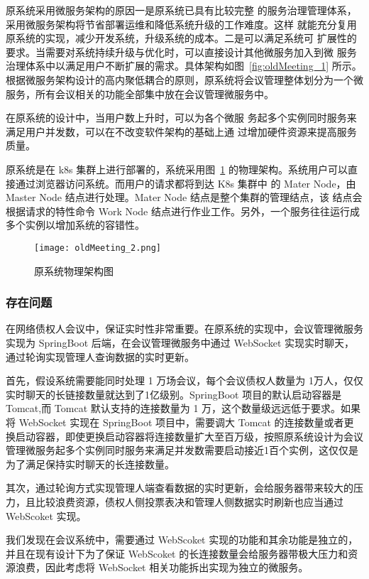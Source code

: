 原系统采用微服务架构的原因一是原系统已具有比较完整
的服务治理管理体系，采用微服务架构将节省部署运维和降低系统升级的工作难度。这样
就能充分复用原系统的实现，减少开发系统，升级系统的成本。二是可以满足系统可
扩展性的要求。当需要对系统持续升级与优化时，可以直接设计其他微服务加入到微
服务治理体系中以满足用户不断扩展的需求。具体架构如图~\ref{fig:oldMeeting_1}\cite{Wang2021} 所示。根据微服务架构设计的高内聚低耦合的原则，原系统将会议管理整体划分为一个微服务，所有会议相关的功能全部集中放在会议管理微服务中。

在原系统的设计中，当用户数上升时，可以为各个微服
务起多个实例同时服务来满足用户并发数，可以在不改变软件架构的基础上通
过增加硬件资源来提高服务质量。

原系统是在 k8s 集群上进行部署的，系统采用图~\ref{fig:oldMeeting_2}
的物理架构。系统用户可以直接通过浏览器访问系统。而用户的请求都将到达 K8s 集群中
的 Mater Node，由 Master Node 结点进行处理。Mater Node 结点是整个集群的管理结点，该
结点会根据请求的特性命令 Work Node 结点进行作业工作。另外，一个服务往往运行成多个实例以增加系统的容错性。

\begin{figure}[!htp]
  \centering
  \texttt{[image: oldMeeting\_2.png]}
  \caption[原物理架构]
    {原系统物理架构图\cite{Wang2021}}
 \label{fig:oldMeeting_2}
\end{figure}

\nocite{Wang2021}
\subsubsection{存在问题}

在网络债权人会议中，保证实时性非常重要。在原系统的实现中，会议管理微服务实现为 SpringBoot 后端，在会议管理微服务中通过 WebSocket 实现实时聊天，通过轮询实现管理人查询数据的实时更新。

首先，假设系统需要能同时处理 1 万场会议，每个会议债权人数量为 1万人，仅仅实时聊天的长链接数量就达到了1亿级别。SpringBoot 项目的默认启动容器是 Tomcat,而 Tomcat 默认支持的连接数量为 1 万，这个数量级远远低于要求。如果将 WebSocket 实现在 SpringBoot 项目中，需要调大 Tomcat 的连接数量或者更换启动容器，即使更换启动容器将连接数量扩大至百万级，按照原系统设计为会议管理微服务起多个实例同时服务来满足并发数需要启动接近1百个实例，这仅仅是为了满足保持实时聊天的长连接数量。

其次，通过轮询方式实现管理人端查看数据的实时更新，会给服务器带来较大的压力，且比较浪费资源，债权人侧投票表决和管理人侧数据实时刷新也应当通过 WebScoket 实现。

我们发现在会议系统中，需要通过 WebScoket 实现的功能和其余功能是独立的，并且在现有设计下为了保证 WebScoket 的长连接数量会给服务器带极大压力和资源浪费，因此考虑将 WebSocket 相关功能拆出实现为独立的微服务。

